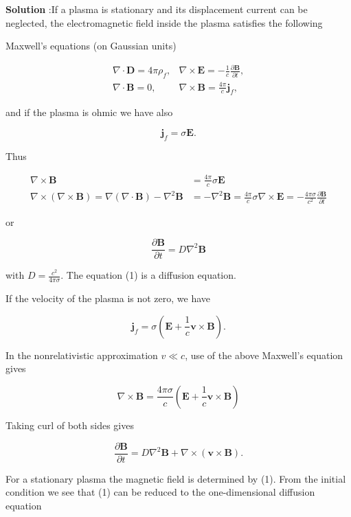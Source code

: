 \documentclass[10pt]{article}
\begin{document}
\textbf{Solution} :If a plasma is stationary and its displacement current can be neglected, the electromagnetic field inside the plasma satisfies the following 

Maxwell's equations (on Gaussian units)

$$
\begin{array}{ll}
\nabla \cdot \mathbf{D}=4 \pi \rho_{f}, & \nabla \times \mathbf{E}=-\frac{1}{c} \frac{\partial \mathbf{B}}{\partial t}, \\
\nabla \cdot \mathbf{B}=0, & \nabla \times \mathbf{B}=\frac{4 \pi}{c} \mathbf{j}_{f},
\end{array}
$$

and if the plasma is ohmic we have also

$$
\mathbf{j}_{f}=\sigma \mathbf{E} .
$$

Thus

$$
\begin{aligned}
\nabla \times \mathbf{B} &=\frac{4 \pi}{c} \sigma \mathbf{E} \\
\nabla \times(\nabla \times \mathbf{B})=\nabla(\nabla \cdot \mathbf{B})-\nabla^{2} \mathbf{B} &=-\nabla^{2} \mathbf{B}=\frac{4 \pi}{c} \sigma \nabla \times \mathbf{E}=-\frac{4 \pi \sigma}{c^{2}} \frac{\partial \mathbf{B}}{\partial t}
\end{aligned}
$$

or

$$
\frac{\partial \mathbf{B}}{\partial t}=D \nabla^{2} \mathbf{B}
$$

with $D=\frac{c^{2}}{4 \pi \sigma}$. The equation (1) is a diffusion equation.

 If the velocity of the plasma is not zero, we have

$$
\mathbf{j}_{f}=\sigma\left(\mathbf{E}+\frac{1}{c} \mathbf{v} \times \mathbf{B}\right) .
$$

In the nonrelativistic approximation $v \ll c$, use of the above Maxwell's equation gives

$$
\nabla \times \mathbf{B}=\frac{4 \pi \sigma}{c}\left(\mathbf{E}+\frac{1}{c} \mathbf{v} \times \mathbf{B}\right)
$$

Taking curl of both sides gives

$$
\frac{\partial \mathbf{B}}{\partial t}=D \nabla^{2} \mathbf{B}+\nabla \times(\mathbf{v} \times \mathbf{B}) .
$$

 For a stationary plasma the magnetic field is determined by (1). From the initial condition we see that (1) can be reduced to the one-dimensional diffusion equation
\end{document}
